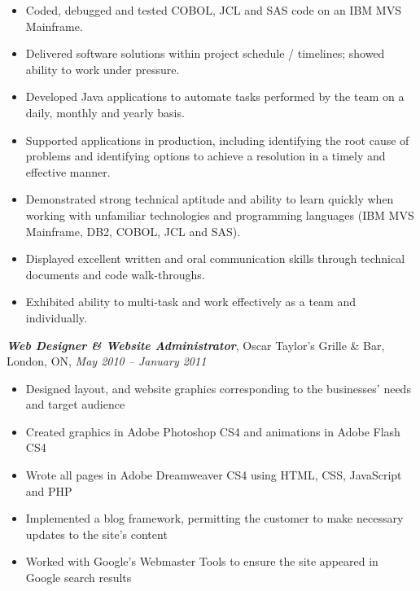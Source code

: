 \documentclass[10pt,letterpaper]{article}
\newenvironment{indentedlist}[1]%
{\begin{list}{}%
	{\setlength{\leftmargin}{#1}}%
	\item[]%
}
{\end{list}}
\newcommand{\job}[4]
{
	\emph{\textbf{#1}}, #2, #3, \emph{#4}
}
\begin{document}
		\begin{indentedlist}{2em}
			\begin{itemize}
				\item Coded, debugged and tested COBOL, JCL and SAS code on an IBM MVS Mainframe.
				\item Delivered software solutions within project schedule / timelines; showed ability to work under pressure.
				\item Developed Java applications to automate tasks performed by the team on a daily, monthly and yearly basis.
				\item Supported applications in production, including identifying the root cause of problems and identifying options to achieve a resolution in a timely and effective manner.
				\item Demonstrated strong technical aptitude and ability to learn quickly when working with unfamiliar technologies and programming languages (IBM MVS Mainframe, DB2, COBOL, JCL and SAS).
				\item Displayed excellent written and oral communication skills through technical documents and code walk-throughs.
				\item Exhibited ability to multi-task and work effectively as a team and individually.
			\end{itemize}
		\end{indentedlist}
		
		\job{Web Designer \& Website Administrator}{Oscar Taylor's Grille \& Bar}{London, ON}{May 2010 -- January 2011}
		
		\begin{indentedlist}{2em}
			\begin{itemize}
				\item Designed layout, and website graphics corresponding to the businesses’ needs and target audience
				\item Created graphics in Adobe Photoshop CS4 and animations in Adobe Flash CS4
				\item Wrote all pages in Adobe Dreamweaver CS4 using HTML, CSS, JavaScript and PHP
				\item Implemented a blog framework, permitting the customer to make necessary updates to the site’s content
				\item Worked with Google’s Webmaster Tools to ensure the site appeared in Google search results
			\end{itemize}
		\end{indentedlist}
		
\end{document}
